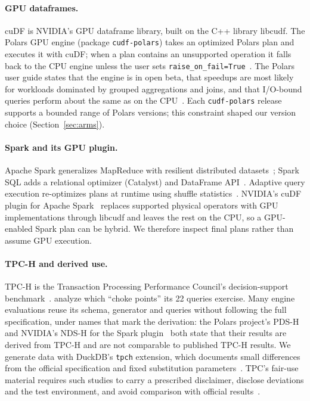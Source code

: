 \documentclass[11pt]{article}
\begin{document}
\paragraph{GPU dataframes.} cuDF is NVIDIA's GPU dataframe library, built on the
C++ library libcudf. The Polars GPU engine (package \texttt{cudf-polars}) takes
an optimized Polars plan and executes it with cuDF; when a plan contains an
unsupported operation it falls back to the CPU engine unless the user sets
\texttt{raise\_on\_fail=True}~\citep{polars_gpu_guide,cudf_polars_docs}. The
Polars user guide states that the engine is in open beta, that speedups are
most likely for workloads dominated by grouped aggregations and joins, and that
I/O-bound queries perform about the same as on the CPU~\citep{polars_gpu_guide}.
Each \texttt{cudf-polars} release supports a bounded range of Polars versions;
this constraint shaped our version choice (Section~\ref{sec:arms}).

\paragraph{Spark and its GPU plugin.} Apache Spark generalizes MapReduce with
resilient distributed datasets~\citep{zaharia2012rdd,zaharia2016spark}; Spark
SQL adds a relational optimizer (Catalyst) and DataFrame
API~\citep{armbrust2015sparksql}. Adaptive query execution re-optimizes plans
at runtime using shuffle statistics~\citep{spark359docs}. NVIDIA's cuDF plugin
for Apache Spark~\citep{nvidia_cudf_spark_docs,nvidia_cudf_spark_repo}
replaces supported physical operators with GPU implementations through libcudf
and leaves the rest on the CPU, so a GPU-enabled Spark plan can be hybrid. We
therefore inspect final plans rather than assume GPU execution.

\paragraph{TPC-H and derived use.} TPC-H is the Transaction Processing
Performance Council's decision-support benchmark~\citep{tpch301,poess2000tpc}.
\citet{boncz2014tpch} analyze which ``choke points'' its 22 queries exercise.
Many engine evaluations reuse its schema, generator and queries without
following the full specification, under names that mark the derivation: the
Polars project's PDS-H~\citep{vink2025pdsh} and NVIDIA's NDS-H for the Spark
plugin~\citep{nvidia_spark_benchmarks} both state that their results are
derived from TPC-H and are not comparable to published TPC-H results. We
generate data with DuckDB's \texttt{tpch} extension, which documents small
differences from the official specification and fixed substitution
parameters~\citep{duckdb_tpch_ext}. TPC's fair-use material requires such
studies to carry a prescribed disclaimer, disclose deviations and the test
environment, and avoid comparison with official
results~\citep{tpcfairuse2019,tpcpolicies620}.
\end{document}
